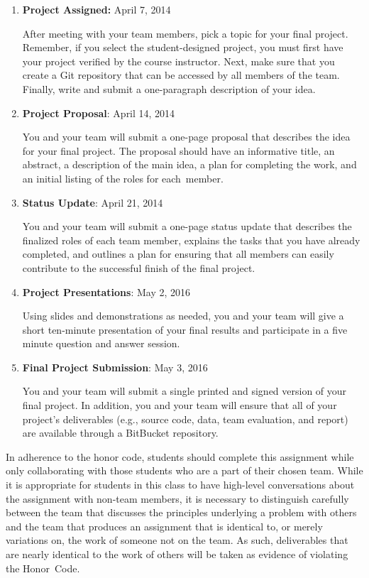 \vspace*{-.05in}
\begin{enumerate}

  \itemsep0in

  \item {\bf Project Assigned:} April 7, 2014

    After meeting with your team members, pick a topic for your final project.  Remember, if you select the
    student-designed project, you must first have your project verified by the course instructor.  Next, make sure that
    you create a Git repository that can be accessed by all members of the team. Finally, write and submit a
    one-paragraph description of your idea.

  \item {\bf Project Proposal}: April 14, 2014

    You and your team will submit a one-page proposal that describes the idea for your final project.  The proposal
    should have an informative title, an abstract, a description of the main idea, a plan for completing the work, and
    an initial listing of the roles for \mbox{each member}.

  \item {\bf Status Update}: April 21, 2014

    You and your team will submit a one-page status update that describes the finalized roles of each team member,
    explains the tasks that you have already completed, and outlines a plan for ensuring that all members can easily
    contribute to the successful finish of the final project.

  \item {\bf Project Presentations}: May 2, 2016

    Using slides and demonstrations as needed, you and your team will give a short ten-minute presentation of your final
    results and participate in a five minute question and answer session.

  \item {\bf Final Project Submission}: May 3, 2016

    You and your team will submit a single printed and signed version of your final project. In addition, you and your
    team will ensure that all of your project's deliverables (e.g., source code, data, team evaluation, and report) are
    available through a BitBucket repository.

\end{enumerate}
\vspace*{-.05in}

In adherence to the honor code, students should complete this assignment while only collaborating with those students
who are a part of their chosen team. While it is appropriate for students in this class to have high-level
conversations about the assignment with non-team members, it is necessary to distinguish carefully between the team that
discusses the principles underlying a problem with others and the team that produces an assignment that is identical to,
or merely variations on, the work of someone not on the team.  As such, deliverables that are nearly identical to the
work of others will be taken as evidence of violating the \mbox{Honor Code}.

  
